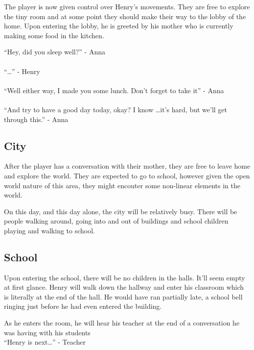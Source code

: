 \documentclass[12pt, a4paper, titlepage]{article}
\begin{document}
            The player is now given control over Henry's movements. They are free to explore the tiny room and at some point
            they should make their way to the lobby of the home. Upon entering the lobby, he is greeted by his mother who is
            currently making some food in the kitchen.

            ``Hey, did you sleep well?'' - Anna\\~\\
            ``\ldots'' - Henry\\~\\
            ``Well either way, I made you some lunch. Don't forget to take it'' - Anna\\~\\
            ``And try to have a good day today, okay? I know \ldots it's hard, but we'll get through this.'' - Anna

        \subsection{City}

            After the player has a conversation with their mother, they are free to leave home and explore the world. They are
            expected to go to school, however given the open world nature of this area, they might encouter some non-linear elements in the
            world.

            On this day, and this day alone, the city will be relatively busy. There will be people walking around, going into and out of buildings and school children
            playing and walking to school.

        \subsection{School}

            Upon entering the school, there will be no children in the halls. It'll seem empty at first glance. Henry will walk down the hallway and enter 
            his classroom which is literally at the end of the hall. He would have ran partially late, a school bell ringing just before he had even entered the building.
            
            As he enters the room, he will hear his teacher at the end of a conversation he was having with his students\\
            
            ``Henry is next\ldots'' - Teacher\\
            
\end{document}
